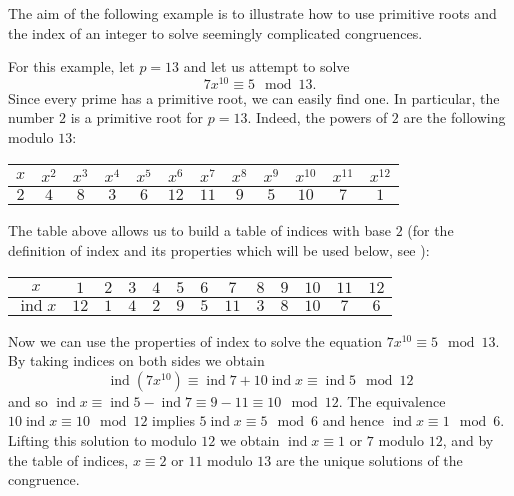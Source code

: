 \documentclass[12pt]{article}
\theoremstyle{definition}
\newcommand{\ind}{\operatorname{ind}}
\begin{document}
The aim of the following example is to illustrate how to use primitive roots and the index of an integer to solve seemingly complicated congruences.

For this example, let $p=13$ and let us attempt to solve $$7x^{10}\equiv 5 \mod 13.$$ Since every prime has a primitive root, we can easily find one. In particular, the number $2$ is a primitive root for $p=13$. Indeed, the powers of $2$ are the following modulo $13$:
\begin{center}
\begin{tabular}{|c|c|c|c|c|c|c|c|c|c|c|c|}
  \hline
  $x$ & $x^2$ & $x^3$ & $x^4$ & $x^5$ & $x^6$ & $x^7$ & $x^8$ & $x^9$ 
& $x^{10}$ & $x^{11}$ & $x^{12}$ \\
  \hline
  $2$ & $4$ & $8$ & $3$ & $6$ & $12$ & $11$ & $9$ & $5$ & $10$ & $7$ & $1$ \\
  \hline
\end{tabular}
\end{center}
The table above allows us to build a table of indices with base $2$ (for the definition of index and its properties which will be used below, see ):

\begin{center}
\begin{tabular}{|c|c|c|c|c|c|c|c|c|c|c|c|c|}
  \hline
  $x$ & $1$ & $2$ & $3$ & $4$ & $5$ & $6$ & $7$ & $8$ & $9$ 
& $10$ & $11$ & $12$ \\
  \hline
  $\ind x$ & $12$ & $1$ & $4$ & $2$ & $9$ & $5$ & $11$ & $3$ & $8$ & $10$ & $7$ & $6$ \\
  \hline
\end{tabular}
\end{center}

Now we can use the properties of index to solve the equation $7x^{10}\equiv 5 \mod 13$. By taking indices on both sides we obtain
$$\ind (7x^{10})\equiv \ind 7 +10\ind x \equiv \ind 5 \mod 12$$
and so $\ind x \equiv \ind 5 - \ind 7 \equiv 9-11\equiv 10 \mod 12$. The equivalence $10\ind x \equiv 10 \mod 12$ implies $5\ind x\equiv 5 \mod 6$ and hence $\ind x \equiv 1 \mod 6$. Lifting this solution to modulo $12$ we obtain $\ind x \equiv 1$ or $7$ modulo $12$, and by the table of indices, $x\equiv 2$ or $11$ modulo $13$ are the unique solutions of the congruence.
\end{document}
